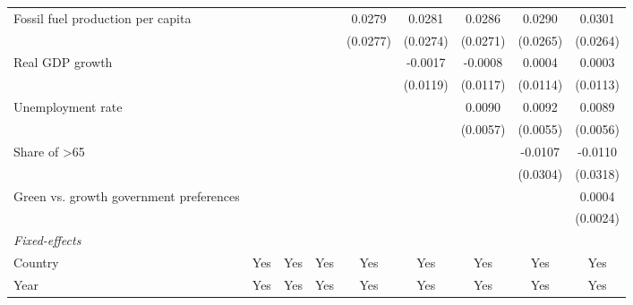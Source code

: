 \begin{table}[htbp]
\begin{tabular}{lcccccccc}
      Fossil fuel production per capita       &                 &                &          & 0.0279        & 0.0281        & 0.0286        & 0.0290         & 0.0301\\   
                                              &                 &                &          & (0.0277)      & (0.0274)      & (0.0271)      & (0.0265)       & (0.0264)\\   
      Real GDP growth                         &                 &                &          &               & -0.0017       & -0.0008       & 0.0004         & 0.0003\\   
                                              &                 &                &          &               & (0.0119)      & (0.0117)      & (0.0114)       & (0.0113)\\   
      Unemployment rate                       &                 &                &          &               &               & 0.0090        & 0.0092         & 0.0089\\   
                                              &                 &                &          &               &               & (0.0057)      & (0.0055)       & (0.0056)\\   
      Share of >65                            &                 &                &          &               &               &               & -0.0107        & -0.0110\\   
                                              &                 &                &          &               &               &               & (0.0304)       & (0.0318)\\   
      Green vs. growth government preferences &                 &                &          &               &               &               &                & 0.0004\\   
                                              &                 &                &          &               &               &               &                & (0.0024)\\   
      \midrule
      \emph{Fixed-effects}\\
      Country                                 & Yes             & Yes            & Yes      & Yes           & Yes           & Yes           & Yes            & Yes\\  
      Year                                    & Yes             & Yes            & Yes      & Yes           & Yes           & Yes           & Yes            & Yes\\  

\end{tabular}
\end{table}
